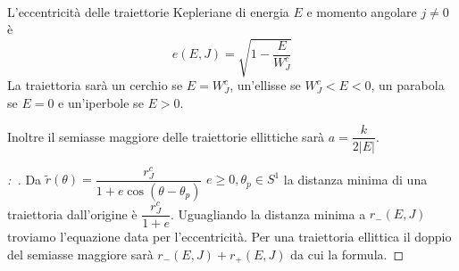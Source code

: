 \documentclass[11pt,a4paper,twoside]{book}
\newenvironment{proposizione}[1][\empty]{\begin{Proposizione}{
\ifx\empty#1\relax\else\mdseries\itshape#1\\\fi
}{}}{\end{Proposizione}}
\newenvironment{dimo}[1][\proofname]{
	\begin{tcolorbox}[
	breakable, 
	enhanced, 
	interior hidden, 
	frame hidden, 
	borderline west = {1pt}{0pt}{gray}, 
	top=0pt, bottom=0pt, left=0pt]
\begin{proof}[#1:~]
}
{
\end{proof}
\end{tcolorbox}
}
\theoremstyle{esss}
\theoremstyle{dotless}
\numberwithin{equation}{section} %
\begin{document}
\begin{proposizione}
L'eccentricità delle traiettorie Kepleriane di energia $E$ e momento angolare $j\neq0$ è 
\begin{equation}
e(E,J)=\sqrt{1-\dfrac{E}{W_J^c}}
\end{equation}
La traiettoria sarà un cerchio se $E=W_J^c$, un'ellisse se $W_J^c<E<0$, un parabola se $E=0$ e un'iperbole se $E>0$.

Inoltre il semiasse maggiore delle traiettorie ellittiche sarà $a=\dfrac{k}{2|E|}$.
\end{proposizione}
\begin{dimo}
Da $\tilde{r}(\theta)=\dfrac{r_J^c}{1+e\cos{(\theta-\theta_p)}}$ $e\geq 0, \theta_p\in S^1$ la distanza minima di una traiettoria dall'origine è $\dfrac{r_J^c}{1+e}$.
Uguagliando la distanza minima a $r_-(E,J)$ troviamo l'equazione data per l'eccentricità. 
Per una traiettoria ellittica il doppio del semiasse maggiore sarà $r_-(E,J)+r_+(E,J)$ da cui la formula. \qedhere
\end{dimo}
\end{document}
